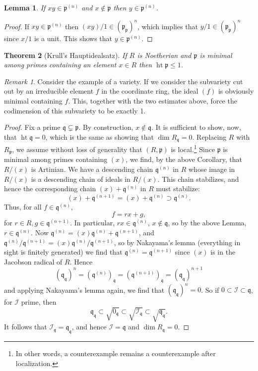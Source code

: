 \documentclass{article}
\newcommand{\fr}{\mathfrak}
\DeclareMathOperator{\hgt}{ht}
\theoremstyle{plain}
\newtheorem{thm}{Theorem}
\newtheorem{lem}[thm]{Lemma}
\theoremstyle{definition}
\theoremstyle{remark}
\newtheorem*{rem}{Remark}
\begin{document}
\begin{lem}
    If $xy\in \fr p^{(n)}$ and $x\notin\fr p$ then $y\in\fr p^{(n)}$.
\end{lem}
\begin{proof}
    If $xy\in\fr p^{(n)}$ then $(xy)/1\in(\fr p_{\fr p})^n$, which implies that $y/1\in(\fr p_{\fr p})^n$
    since $x/1$ is a unit. This shows that $y\in\fr p^{(n)}$.
\end{proof}

\begin{thm}[Krull's Hauptidealsatz]
    If $R$ is Noetherian and $\fr p$ is minimal among primes containing an element $x\in R$ then
    $\hgt\fr p\leq 1$.
\end{thm}

\begin{rem}
    Consider the example of a variety. If we consider the subvariety cut out
    by an irreducible element $f$ in the coordinate ring, the ideal $(f)$ is obviously minimal
    containing $f$. This, together with the two estimates above, force the codimension of this
    subvariety to be exactly 1.
\end{rem}

\begin{proof}
    Fix a prime $\fr q\subsetneq\fr p$. By construction, $x\notin\fr q$. It is sufficient to
    show, now, that $\hgt\fr q=0$, which is the same as showing that $\dim R_{\fr q}=0$.
    Replacing $R$ with $R_{\fr p}$, we assume without loss of generality that $(R,\fr p)$ is local.\footnote{In
    other words, a counterexample remains a counterexample after localization.}
    Since $\fr p$ is minimal among primes containing $(x)$, we find, by
    the above Corollary, that $R/(x)$ is Artinian. We have a descending chain $\fr q^{(n)}$ in $R$
    whose image in $R/(x)$ is a descending chain of ideals in $R/(x)$.
    This chain stabilizes, and hence the corresponding chain $(x)+\fr q^{(n)}$ in $R$ must stabilize:
    \[(x)+\fr q^{(n+1)}=(x)+\fr q^{(n)}\supset\fr q^{(n)}.\]
    Thus, for all $f\in\fr q^{(n)}$, \[f=rx+g,\] for $r\in R,g\in\fr q^{(n+1)}$.
    In particular, $rx\in\fr q^{(n)}$, $x\notin\fr q$, so by the above Lemma, $r\in\fr q^{(n)}$.
    Now $\fr q^{(n)}=(x)\fr q^{(n)}+\fr q^{(n+1)}$, and $\fr q^{(n)}/\fr q^{(n+1)}=(x)\fr q^{(n)}/\fr q^{(n+1)}$,
    so by Nakayama's lemma (everything in sight is finitely generated) we find that $\fr q^{(n)}=\fr q^{(n+1)}$
    since $(x)$ is in the Jacobson radical of $R$. Hence
    \[(\fr q_{\fr q})^n=(\fr q^{(n)})_{\fr q}=(\fr q^{(n+1)})_{\fr q}=(\fr q_{\fr q})^{n+1}\]
    and applying Nakayama's lemma again, we find that $(\fr q_{\fr q})^n=0$.
    So if $0\subset\mathcal{I}\subset\fr q$, for $\mathcal{I}$ prime, then 
    \[\fr q_{\fr q}\subset \sqrt{0_{\fr q}}\subset\sqrt{\mathcal{I}_{\fr q}}\subset \sqrt{\fr q_{\fr q}}.\]
    It follows that $\mathcal{I}_{\fr q}=\fr q_{\fr q}$, and hence $\mathcal{I}=\fr q$ and $\dim R_{\fr q}=0$.
\end{proof}
\end{document}
